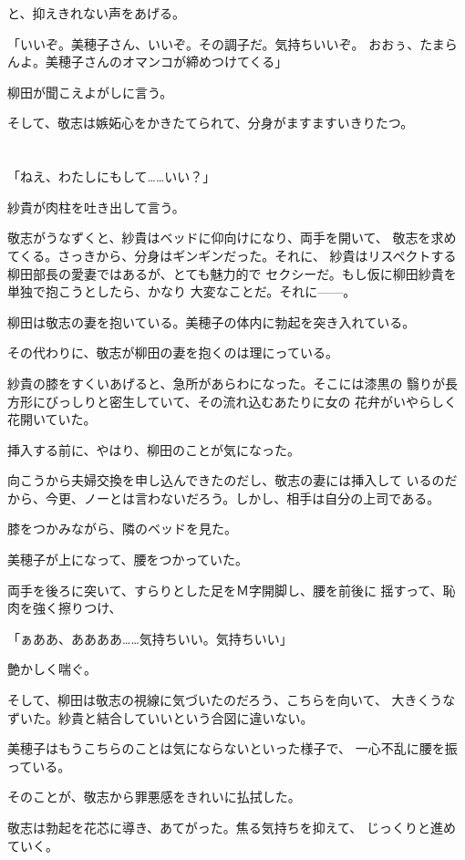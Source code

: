 ﻿\documentclass[
    book,tate,
    line_length=30zw,
    jafontsize=12pt,
    paper=b5j,
    landscape,
    ]{jlreq}
\begin{document}
と、抑えきれない声をあげる。

「いいぞ。美穂子さん、いいぞ。その調子だ。気持ちいいぞ。
おおぅ、たまらんよ。美穂子さんのオマンコが締めつけてくる」

柳田が聞こえよがしに言う。

そして、敬志は嫉妬心をかきたてられて、分身がますますいきりたつ。

\section*{}

「ねえ、わたしにもして……いい？」

紗貴が肉柱を吐き出して言う。

敬志がうなずくと、紗貴はベッドに仰向けになり、両手を開いて、
敬志を求めてくる。さっきから、分身はギンギンだった。それに、
紗貴はリスペクトする柳田部長の愛妻ではあるが、とても魅力的で
セクシーだ。もし仮に柳田紗貴を単独で抱こうとしたら、かなり
大変なことだ。それに------。

柳田は敬志の妻を抱いている。美穂子の体内に勃起を突き入れている。

その代わりに、敬志が柳田の妻を抱くのは理にっている。

紗貴の膝をすくいあげると、急所があらわになった。そこには漆黒の
翳りが長方形にびっしりと密生していて、その流れ込むあたりに女の
花弁がいやらしく花開いていた。

挿入する前に、やはり、柳田のことが気になった。

向こうから夫婦交換を申し込んできたのだし、敬志の妻には挿入して
いるのだから、今更、ノーとは言わないだろう。しかし、相手は自分の上司である。

膝をつかみながら、隣のベッドを見た。

美穂子が上になって、腰をつかっていた。

両手を後ろに突いて、すらりとした足をＭ字開脚し、腰を前後に
揺すって、恥肉を強く擦りつけ、

「ぁああ、ああああ……気持ちいい。気持ちいい」

艶かしく喘ぐ。

そして、柳田は敬志の視線に気づいたのだろう、こちらを向いて、
大きくうなずいた。紗貴と結合していいという合図に違いない。

美穂子はもうこちらのことは気にならないといった様子で、
一心不乱に腰を振っている。

そのことが、敬志から罪悪感をきれいに払拭した。

敬志は勃起を花芯に導き、あてがった。焦る気持ちを抑えて、
じっくりと進めていく。
\end{document}
